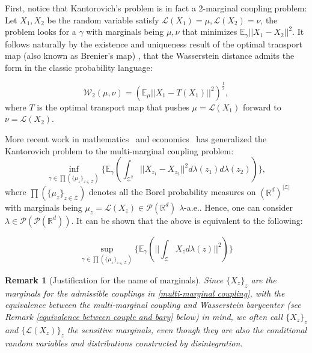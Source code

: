 \documentclass[twoside,11pt]{article}
\newtheorem{rema}{Remark}[section]{\bfseries}{\itshape}
\begin{document}
First, notice that Kantorovich's problem is in fact a 2-marginal coupling problem: Let $X_1,X_2$ be the random variable satisfy $\mathcal{L}(X_1) = \mu, \mathcal{L}(X_2) = \nu$, the problem looks for a $\gamma$ with marginals being $\mu, \nu$ that minimizes $\mathbb{E}_{\gamma} ||X_1 - X_2||^2$. It follows naturally by the existence and uniqueness result of the optimal transport map (also known as Brenier's map) \cite{brenier1991polar}, that the Wasserstein distance admits the form in the classic probability language:

\begin{equation}
\mathcal{W}_2(\mu,\nu) = (\mathbb{E}_{\mu} ||X_1 - T(X_1)||^2)^{\frac{1}{2}},
\end{equation}
where $T$ is the optimal transport map that pushes $\mu = \mathcal{L}(X_1)$ forward to $\nu = \mathcal{L}(X_2)$.

More recent work in mathematics~\cite{kim2017wasserstein, pass2013optimal} and economics~\cite{carlier2010matching, ekeland2010existence} has generalized the Kantorovich problem to the multi-marginal coupling problem: 
\begin{equation}\label{multi-marginal coupling}
\inf_{\gamma \in \prod(\{\mu_z\}_{z \in \mathcal{Z}})} \big\{\mathbb{E}_{\gamma}(\int_{\mathcal{Z}^2} ||X_{z_1} - X_{z_2}||^2 d\lambda(z_1)d\lambda(z_2) )\big\},
\end{equation}
where $\prod(\{\mu_z\}_{z \in \mathcal{Z}})$  denotes all the Borel probability measures on $(\mathbb{R}^d)^{|\mathcal{Z}|}$ with marginals being $\mu_z = \mathcal{L}(X_z) \in \mathcal{P}(\mathbb{R}^d)$ $\lambda$-a.e..  Hence, one can consider $\lambda \in \mathcal{P}(\mathcal{P}(\mathbb{R}^d))$.  It can be shown that the above is equivalent to the following:

\begin{equation}\label{maxcov}
\sup_{\gamma \in \prod(\{\mu_z\}_{z \in \mathcal{Z}})} \big\{\mathbb{E}_{\gamma}(||\int_{\mathcal{Z}} X_{z} d\lambda(z)||^2) \big\}
\end{equation}

\begin{rema}[Justification for the name of marginals]\label{r:name of marginals}
Since $\{X_z\}_z$ are the marginals for the admissible couplings in \eqref{multi-marginal coupling}, with the equivalence between the multi-marginal coupling and Wasserstein barycenter (see Remark \ref{equivalence between couple and bary} below) in mind, we often call $\{X_z\}_z$ and $\{\mathcal{L}(X_z)\}_z$ the sensitive marginals, even though they are also the conditional random variables and distributions constructed by disintegration.
\end{rema}
\end{document}
